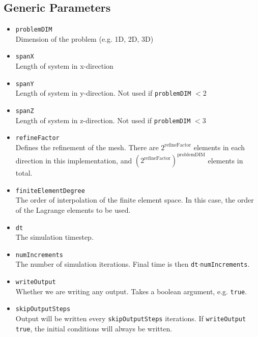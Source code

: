 \documentclass[11pt]{article}
\begin{document}
\subsection{Generic Parameters}
\begin{itemize}
\item \texttt{problemDIM} \\
	Dimension of the problem (e.g. 1D, 2D, 3D)
\item \texttt{spanX} \\
	Length of system in x-direction
\item \texttt{spanY} \\
	Length of system in y-direction.  Not used if \texttt{problemDIM} $< 2$
\item \texttt{spanZ} \\
	Length of system in z-direction.  Not used if \texttt{problemDIM} $< 3$
\item \texttt{refineFactor} \\
	Defines the refinement of the mesh.  There are $2^{\mathrm{refineFactor}}$ elements in each direction in this implementation, and 						$\left( 2^{\mathrm{refineFactor}} \right)^{\mathrm{problemDIM}}$ elements in total.
\item \texttt{finiteElementDegree} \\
	The order of interpolation of the finite element space.  In this case, the order of the Lagrange elements to be used.
\item \texttt{dt} \\
	The simulation timestep.
\item \texttt{numIncrements} \\
	The number of simulation iterations.  Final time is then \texttt{dt}$\cdot$\texttt{numIncrements}.
\item \texttt{writeOutput} \\
	Whether we are writing any output.  Takes a boolean argument, e.g. \texttt{true}.
\item \texttt{skipOutputSteps} \\
	Output will be written every \texttt{skipOutputSteps} iterations.  If \texttt{writeOutput} \texttt{true}, the initial conditions will always be written.
\end{itemize}

\end{document}

